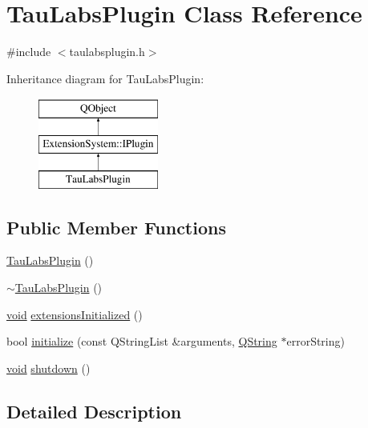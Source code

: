 \hypertarget{class_tau_labs_plugin}{\section{Tau\-Labs\-Plugin Class Reference}
\label{class_tau_labs_plugin}
}


{\ttfamily \#include $<$taulabsplugin.\-h$>$}

Inheritance diagram for Tau\-Labs\-Plugin\-:\begin{figure}[H]
\begin{center}
\leavevmode
\includegraphics[height=3.000000cm]{class_tau_labs_plugin}
\end{center}
\end{figure}
\subsection*{Public Member Functions}
\begin{DoxyCompactItemize}
\item 
\hyperlink{group___boards___tau_labs_plugin_gaee528ef25fec71f73309b849859399e9}{Tau\-Labs\-Plugin} ()
\item 
\hyperlink{group___boards___tau_labs_plugin_ga861e4dbacf34fb519437082e3f859655}{$\sim$\-Tau\-Labs\-Plugin} ()
\item 
\hyperlink{group___u_a_v_objects_plugin_ga444cf2ff3f0ecbe028adce838d373f5c}{void} \hyperlink{group___boards___tau_labs_plugin_gae657bb027ed736aeb4e371bdb9a6bff7}{extensions\-Initialized} ()
\item 
bool \hyperlink{group___boards___tau_labs_plugin_ga1f025f9260a3a6745cbe0d35f3ecd563}{initialize} (const Q\-String\-List \&arguments, \hyperlink{group___u_a_v_objects_plugin_gab9d252f49c333c94a72f97ce3105a32d}{Q\-String} $\ast$error\-String)
\item 
\hyperlink{group___u_a_v_objects_plugin_ga444cf2ff3f0ecbe028adce838d373f5c}{void} \hyperlink{group___boards___tau_labs_plugin_ga7c69e7ef31a4c5b510b1aa88de11dda9}{shutdown} ()
\end{DoxyCompactItemize}


\subsection{Detailed Description}


